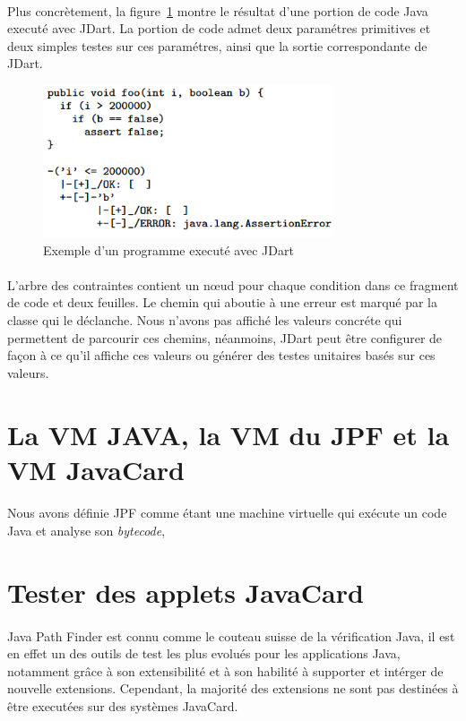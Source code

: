 			\paragraph{}
				Plus concrètement, la figure~\ref{fig:jdart_sample} montre le résultat d'une portion de code Java executé avec JDart.
				La portion de code admet deux paramétres primitives et deux simples testes sur ces paramétres, ainsi que la sortie correspondante
				de JDart.
				
			\begin{figure}[H]
				\centering
					\includegraphics[scale=0.5]{images/jdart_exemple.png}
				\caption{\label{fig:jdart_sample} Exemple d'un programme executé avec JDart}
			\end{figure}
			
			\paragraph{}
				L'arbre des contraintes contient un n\oe{}ud pour chaque condition dans ce fragment de code et deux feuilles.
				Le chemin qui aboutie à une erreur est marqué par la classe qui le déclanche.
				Nous n'avons pas affiché les valeurs concréte qui permettent de parcourir ces chemins, néanmoins, JDart peut être configurer
				de façon à ce qu'il affiche ces valeurs ou générer des testes unitaires basés sur ces valeurs.
      
	\section{La VM JAVA, la VM du JPF et la VM JavaCard}
		\paragraph{}
			Nous avons définie \gls{JPF} comme étant une machine virtuelle qui exécute un code Java et analyse son \textit{\gls{bytecode}},
			
	\section{Tester des applets JavaCard}
	\paragraph{}
		Java Path Finder est connu comme le couteau suisse de la vérification Java,
		il est en effet un des outils de test les plus evolués pour les applications Java,
		notamment grâce à son extensibilité et à son habilité à supporter et intérger de nouvelle extensions.
		Cependant, la majorité des extensions ne sont pas destinées à être executées sur des systèmes JavaCard.